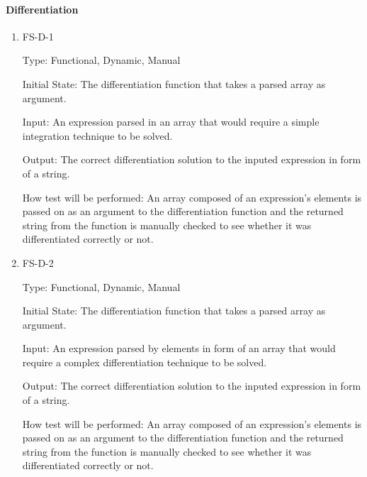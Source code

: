 \documentclass[12pt, titlepage]{article}
\begin{document}
\paragraph{Differentiation}
\begin{enumerate}

\item{FS-D-1}

Type: Functional, Dynamic, Manual
					
Initial State: The differentiation function that takes a parsed array as argument.
					
Input: An expression parsed in an array that would require a simple integration technique to be solved.
					
Output: The correct differentiation solution to the inputed expression in form of a string. 
					
How test will be performed: An array composed of an expression's elements is passed on as an argument to the differentiation function and the returned string from the function is manually checked to see whether it was differentiated correctly or not.
					
\item{FS-D-2}

Type: Functional, Dynamic, Manual
					
Initial State: The differentiation function that takes a parsed array as argument.
					
Input: An expression parsed by elements in form of an array that would require a complex differentiation technique to be solved.
					
Output: The correct differentiation solution to the inputed expression in form of a string. 
					
How test will be performed: An array composed of an expression's elements is passed on as an argument to the differentiation function and the returned string from the function is manually checked to see whether it was differentiated correctly or not.
\end{enumerate}
\end{document}
